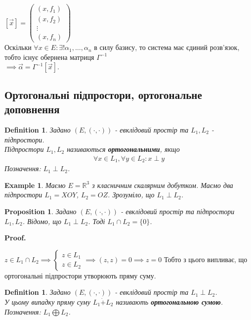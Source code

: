 \documentclass[a4paper, 10pt]{article}
\makeatletter
\theoremstyle{theoremdd}
\newtheorem{definition}[theorem]{Definition}
\newtheorem{example}[theorem]{Example}
\newtheorem{proposition}[theorem]{Proposition}
\renewenvironment{proof}[1][Proof.\\]{\par
\pushQED{\hfill \qed}%
\normalfont \topsep6\p@\@plus6\p@\relax
\trivlist
\item\relax
{\bfseries
#1\@addpunct{.}}\hspace\labelsep\ignorespaces
}{%
\popQED\endtrivlist\@endpefalse
}
\makeatother
\begin{document}
$[\vec{x}] = \begin{pmatrix}
(x,f_1) \\ (x,f_2) \\ \vdots \\ (x,f_n)
\end{pmatrix}$\\
Оскільки $\forall x \in E: \exists! \alpha_1,\dots,\alpha_n$ в силу базису, то система має єдиний розв'язок, тобто існує обернена матриця $\Gamma^{-1}$\\
$\implies \vec{\alpha} = \Gamma^{-1} [\vec{x}]$.

\subsection{Ортогональні підпростори, ортогональне доповнення}
\begin{definition}
Задано $(E, (\cdot,\cdot))$ - евклідовий простір та $L_1,L_2$ - підпростори.\\
Підпростори $L_1,L_2$ називаються \textbf{ортогональними}, якщо
\begin{align*}
\forall x \in L_1, \forall y \in L_2: x \perp y
\end{align*}
Позначення: $L_1 \perp L_2$.
\end{definition}

\begin{example}
Маємо $E = \mathbb{R}^3$  з класничним скалярним добутком. Маємо два підпростори $L_1 = XOY$, $L_2 = OZ$. Зрозуміло, що $L_1 \perp L_2$.
\end{example}

\begin{proposition}
Задано $(E,(\cdot,\cdot))$ - евклідовий простір та підпростори $L_1,L_2$. Відомо, що
$L_1 \perp L_2$. Тоді $L_1 \cap L_2 = \{0\}$.
\end{proposition}

\begin{proof}
$z \in L_1 \cap L_2 \implies \begin{cases} z \in L_1 \\ z \in L_2 \end{cases} \implies (z,z) = 0 \implies z = 0$
\end{proof}
Тобто з цього випливає, що ортогональні підпростори утворюють пряму суму.

\begin{definition}
Задано $(E, (\cdot,\cdot))$ - евклідовий простір та $L_1 \perp L_2$.\\
У цьому випадку пряму суму $L_1 \dot{+} L_2$ називають \textbf{ортогональною сумою}.\\
Позначення: $L_1 \bigoplus L_2$.
\end{definition}
\end{document}
